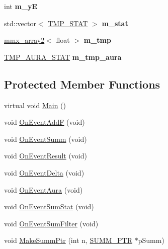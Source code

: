 \begin{DoxyCompactItemize}
\item 
\hypertarget{class_c_v_i_engine_thread_ae9849fe1f1cba016b9df4e33fd9c2092}{int {\bfseries m\+\_\+y\+E}}\label{class_c_v_i_engine_thread_ae9849fe1f1cba016b9df4e33fd9c2092}

\item 
\hypertarget{class_c_v_i_engine_thread_aa356e0ebc6490ee932679fb7ca5021b5}{std\+::vector$<$ \hyperlink{struct_c_v_i_engine_thread_1_1tag_t_m_p___s_t_a_t}{T\+M\+P\+\_\+\+S\+T\+A\+T} $>$ {\bfseries m\+\_\+stat}}\label{class_c_v_i_engine_thread_aa356e0ebc6490ee932679fb7ca5021b5}

\item 
\hypertarget{class_c_v_i_engine_thread_af213b9d425f314412e3de05774960c3f}{\hyperlink{classmmx__array2}{mmx\+\_\+array2}$<$ float $>$ {\bfseries m\+\_\+tmp}}\label{class_c_v_i_engine_thread_af213b9d425f314412e3de05774960c3f}

\item 
\hypertarget{class_c_v_i_engine_thread_a6ffad2b9d46d3d237d194b7d07720f6b}{\hyperlink{struct_c_v_i_engine_thread_1_1tag_t_m_p___a_u_r_a___s_t_a_t}{T\+M\+P\+\_\+\+A\+U\+R\+A\+\_\+\+S\+T\+A\+T} {\bfseries m\+\_\+tmp\+\_\+aura}}\label{class_c_v_i_engine_thread_a6ffad2b9d46d3d237d194b7d07720f6b}

\end{DoxyCompactItemize}
\subsection*{Protected Member Functions}
\begin{DoxyCompactItemize}
\item 
virtual void \hyperlink{class_c_v_i_engine_thread_a24ed1bd13eea28048ed010e65697e578}{Main} ()
\item 
void \hyperlink{class_c_v_i_engine_thread_aa9882f7bd24457ef387daf9b878d9e36}{On\+Event\+Add\+F} (void)
\item 
void \hyperlink{class_c_v_i_engine_thread_ac41086d9d426c39ce9a5ab78bdff6f8d}{On\+Event\+Summ} (void)
\item 
void \hyperlink{class_c_v_i_engine_thread_a59da3179cc28387c9ebe468cdb33bcb1}{On\+Event\+Result} (void)
\item 
void \hyperlink{class_c_v_i_engine_thread_ae5c43326cf2db88c2233f60412113e14}{On\+Event\+Delta} (void)
\item 
void \hyperlink{class_c_v_i_engine_thread_a5631fcb6ffa27a49f369ae01473862a2}{On\+Event\+Aura} (void)
\item 
void \hyperlink{class_c_v_i_engine_thread_ade67a36c8b54ee5bb4fae3dac9871274}{On\+Event\+Sum\+Stat} (void)
\item 
void \hyperlink{class_c_v_i_engine_thread_aa6eb58239fd138860ec06da35715ab9f}{On\+Event\+Sum\+Filter} (void)
\item 
void \hyperlink{class_c_v_i_engine_thread_a6b428d3d881e10a03902dbf16742084e}{Make\+Summ\+Ptr} (int n, \hyperlink{struct_c_v_i_engine_thread_1_1tag_s_u_m_m___p_t_r}{S\+U\+M\+M\+\_\+\+P\+T\+R} $\ast$p\+Summ)
\end{DoxyCompactItemize}
